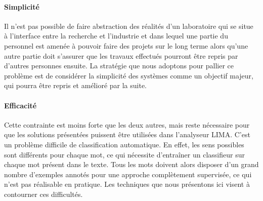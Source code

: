 \paragraph{Simplicité} Il n'est pas possible de faire abstraction des réalités
d'un laboratoire qui se situe à l'interface entre la recherche et l'industrie
et dans lequel une partie du personnel est amenée à pouvoir faire des projets
sur le long terme alors qu'une autre partie doit s'assurer que les travaux
effectués pourront être repris par d'autres personnes ensuite. La stratégie que
nous adoptons pour pallier ce problème est de considérer la simplicité des
systèmes comme un objectif majeur, qui pourra être repris et amélioré par la
suite.

\paragraph{Efficacité} Cette contrainte est moins forte que les deux autres,
mais reste nécessaire pour que les solutions présentées puissent être
utilisées dans l'analyseur LIMA.  C'est un problème difficile de
classification automatique. En effet, les sens possibles sont différents pour
chaque mot, ce qui nécessite d'entraîner un classifieur sur chaque mot présent
dans le texte. Tous les mots doivent alors disposer d'un grand nombre
d'exemples annotés pour une approche complètement supervisée, ce qui n'est pas
réalisable en pratique. Les techniques que nous présentons ici visent à
contourner ces difficultés.

